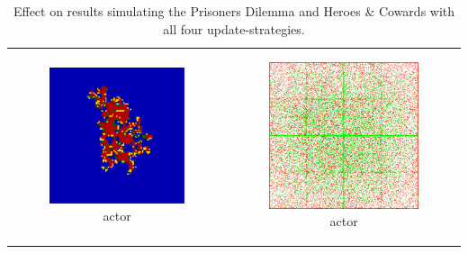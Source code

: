 \begin{table}
\begin{tabular}{c c}
		\begin{subfigure}[b]{0.4\textwidth}
			\centering
			\includegraphics[width=.7\textwidth, angle=0]{./fig/act_99x99_436steps_MSG_haskell.png}
			\caption{actor}
			\label{fig:pd_act}
		\end{subfigure}
    	& 
		\begin{subfigure}[b]{0.4\textwidth}
			\centering
			\includegraphics[width=.7\textwidth, angle=0]{./fig/act_HAC_100_000_500steps_scala.png}
			\caption{actor}
			\label{fig:hac_act}
		\end{subfigure}

	\end{tabular}
	
	\caption{\small Effect on results simulating the Prisoners Dilemma and Heroes \& Cowards with all four update-strategies.} 
	\label{fig:results}
\end{table}

